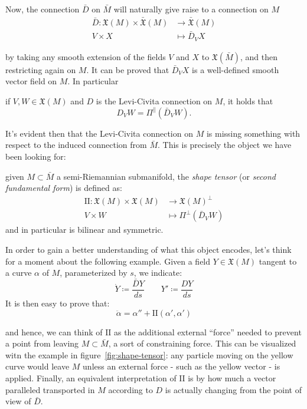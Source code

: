 Now, the connection \(\bar{D}\) on \(\bar{M}\) will naturally give raise to a connection on \(M\)
\begin{align*}
\bar{D} : \mathfrak{X}(M) \times \bar{\mathfrak{X}}(M) & \rightarrow \bar{\mathfrak{X}}(M) \\
	 V \times X &\mapsto \bar{D}_V X
\end{align*}

by taking any smooth extension of the fields \(V\) and \(X\) to \(\mathfrak{X}(\bar{M})\), and then restricting again on \(M\). It can be proved that \(\bar{D}_V X\) is a well-defined smooth vector field on \(M\). In particular
\begin{lemma} 
	if \(V, W \in \mathfrak{X}(M)\) and \(D\) is the Levi-Civita connection on \(M\), it holds that
	\[
	D_V W = \Pi^{\parallel}\left(\bar{D}_V W\right).
	\]
\end{lemma}

It's evident then that the Levi-Civita connection on \(M\) is missing something with respect to the induced connection from \(\bar{M}\). This is precisely the object we have been looking for:

\begin{definition}
	given \(M \subset \bar{M}\) a semi-Riemannian submanifold, the \emph{shape tensor} (or \emph{second fundamental form}) is defined as:
	\begin{align*}
		\mathrm{I\!I} : \mathfrak{X}(M) \times \mathfrak{X}(M) &\longrightarrow \mathfrak{X}(M)^{\perp}\\
							V \times W &\mapsto \Pi^{\perp}\left(\bar{D}_V W\right)
	\end{align*}
	\noindent and in particular is bilinear and symmetric.
\end{definition}

In order to gain a better understanding of what this object encodes, let's think for a moment about the following example. Given a field \(Y \in \mathfrak{X}(M)\) tangent to a curve \(\alpha\) of \(M\), parameterized by \(s\), we indicate:
\[
\dot{Y} \coloneqq \frac{\bar{D}Y}{ds} \quad \quad Y' \coloneqq \frac{DY}{ds}
\]
It is then easy to prove that:
\[
\ddot{\alpha} = \alpha'' + \mathrm{I\!I}(\alpha', \alpha')
\]

and hence, we can think of \(\mathrm{I\!I}\) as the additional external ``force'' needed to prevent a point from leaving \(M \subset \bar{M}\), a sort of constraining force.
This can be visualized witn the example in figure~\ref{fig:shape-tensor}: any particle moving on the yellow curve would leave \(M\) unless an external force - such as the yellow vector - is applied.
Finally, an equivalent interpretation of \(\mathrm{I\!I}\) is by how much a vector paralleled transported in \(M\) according to \(D\) is actually changing from the point of view of \(\bar{D}\).

